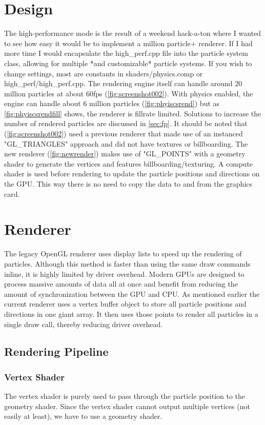 \documentclass[]{report}
\begin{document}
\section{Design}
The high-performance mode is the result of a weekend hack-a-ton where I wanted to see how easy it would be to implement a million particle+ renderer. If I had more time I would encapsulate the high\_perf.cpp file into the particle system class, allowing for multiple *and customizable* particle systems. If you wish to change settings, most are constants in shaders/physics.comp or high\_perf/high\_perf.cpp. The rendering engine itself can handle around 20 million particles at about 60fps (\autoref{fig:screenshot002}). With physics enabled, the engine can handle about 6 million particles (\autoref{fig:phyiscsrend}) but as \autoref{fig:phyiscsrendfill} shows, the renderer is fillrate limited. Solutions to increase the number of rendered particles are discussed in \autoref{sec:fp}. It should be noted that (\autoref{fig:screenshot002}) used a previous renderer that made use of an instanced "GL\_TRIANGLES" approach and did not have textures or billboarding. The new renderer (\autoref{fig:newrender}) makes use of "GL\_POINTS" with a geometry shader to generate the vertices and features billboarding/texturing. A compute shader is used before rendering to update the particle positions and directions on the GPU. This way there is no need to copy the data to and from the graphics card.
\section{Renderer}
The legacy OpenGL renderer uses display lists to speed up the rendering of particles. Although this method is faster than using the same draw commands inline, it is highly limited by driver overhead. Modern GPUs are designed to process massive amounts of data all at once and benefit from reducing the amount of synchronization between the GPU and CPU. As mentioned earlier the current renderer uses a vertex buffer object to store all particle positions and directions in one giant array. It then uses those points to render all particles in a single draw call, thereby reducing driver overhead.
\subsection{Rendering Pipeline}
\subsubsection{Vertex Shader}
The vertex shader is purely used to pass through the particle position to the geometry shader. Since the vertex shader cannot output multiple vertices (not easily at least), we have to use a geometry shader.
\end{document}
